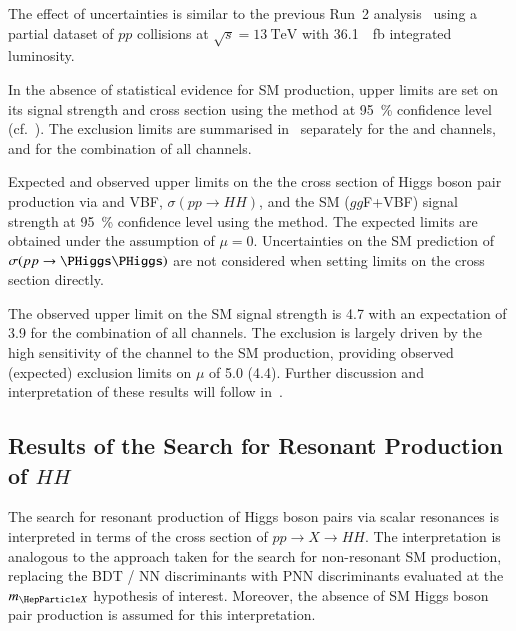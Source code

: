  The effect of uncertainties is similar
to the previous Run~2 analysis~\cite{HIGG-2016-16-witherratum} using a
partial dataset of $pp$ collisions at $\sqrt{s} = \SI{13}{\TeV}$ with
\SI{36.1}{\per\femto\barn} integrated luminosity.

In the absence of statistical evidence for SM \HH production, upper
limits are set on its signal strength and cross section using the \CLs
method at \SI{95}{\percent} confidence level (cf.\
). The exclusion limits are summarised
in~\Cref{tab:limits_non_resonant} separately for the \lephad and
\hadhad channels, and for the combination of all channels.

\begin{table}[htbp]
  \centering

  \caption{Expected and observed upper limits on the the cross section
    of Higgs boson pair production via \ggF and VBF,
    $\sigma(pp \to HH)$, and the SM \HH ($gg$F+VBF) signal strength at
    \SI{95}{\percent} confidence level using the \CLs method. The
    expected limits are obtained under the assumption of $\mu =
    0$. Uncertainties on the SM prediction of $\sigma(pp \to \HH)$ are
    not considered when setting limits on the cross section
    directly.}%
  \label{tab:limits_non_resonant}

  
\end{table}

The observed upper limit on the SM \HH signal strength is \num{4.7}
with an expectation of \num{3.9} for the combination of all channels.
The exclusion is largely driven by the high sensitivity of the \hadhad
channel to the SM \HH production, providing observed (expected)
exclusion limits on $\mu$ of \num{5.0} (\num{4.4}). Further discussion
and interpretation of these results will follow
in~.


\subsection{Results of the Search for Resonant Production of $HH$}
\label{sec:results_res}

The search for resonant production of Higgs boson pairs via scalar
resonances is interpreted in terms of the cross section of
$pp \to X \to HH$. The interpretation is analogous to the approach
taken for the search for non-resonant SM \HH production, replacing the
BDT / NN discriminants with PNN discriminants evaluated at the $\mX$
hypothesis of interest. Moreover, the absence of SM Higgs boson pair
production is assumed for this interpretation.

